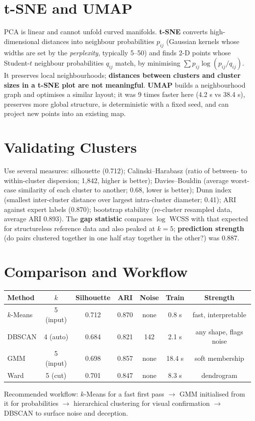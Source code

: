 \documentclass[11pt]{article}
\begin{document}
\section{t-SNE and UMAP}
PCA is linear and cannot unfold curved manifolds. \textbf{t-SNE} converts high-dimensional distances into neighbour probabilities $p_{ij}$ (Gaussian kernels whose widths are set by the \emph{perplexity}, typically 5--50) and finds 2-D points whose Student-$t$ neighbour probabilities $q_{ij}$ match, by minimising $\sum p_{ij}\log(p_{ij}/q_{ij})$. It preserves local neighbourhoods; \textbf{distances between clusters and cluster sizes in a t-SNE plot are not meaningful}. \textbf{UMAP} builds a neighbourhood graph and optimises a similar layout; it was 9 times faster here (4.2 s vs 38.4 s), preserves more global structure, is deterministic with a fixed seed, and can project new points into an existing map.

\section{Validating Clusters}
Use several measures: silhouette (0.712); Calinski--Harabasz (ratio of between- to within-cluster dispersion; 1,842, higher is better); Davies--Bouldin (average worst-case similarity of each cluster to another; 0.68, lower is better); Dunn index (smallest inter-cluster distance over largest intra-cluster diameter; 0.41); ARI against expert labels (0.870); bootstrap stability (re-cluster resampled data, average ARI 0.893). The \textbf{gap statistic} compares $\log$ WCSS with that expected for structureless reference data and also peaked at $k=5$; \textbf{prediction strength} (do pairs clustered together in one half stay together in the other?) was 0.887.

\section{Comparison and Workflow}
\begin{center}\small\renewcommand{\arraystretch}{1.2}
\begin{tabular}{lcccccc}\toprule Method & $k$ & Silhouette & ARI & Noise & Train & Strength\\\midrule $k$-Means & 5 (input) & 0.712 & 0.870 & none & 0.8 s & fast, interpretable\\ DBSCAN & 4 (auto) & 0.684 & 0.821 & 142 & 2.1 s & any shape, flags noise\\ GMM & 5 (input) & 0.698 & 0.857 & none & 18.4 s & soft membership\\ Ward & 5 (cut) & 0.701 & 0.847 & none & 8.3 s & dendrogram\\\bottomrule\end{tabular}\end{center}
Recommended workflow: $k$-Means for a fast first pass $\to$ GMM initialised from it for probabilities $\to$ hierarchical clustering for visual confirmation $\to$ DBSCAN to surface noise and deception.
\end{document}
